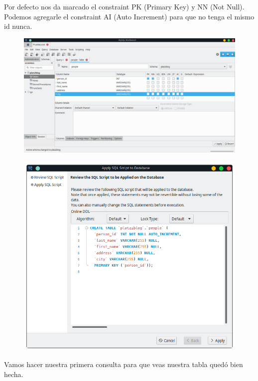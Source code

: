 \documentclass{article}
\begin{document}
\newpage
Por defecto nos da marcado el constraint PK (Primary Key) y NN (Not Null).
Podemos agregarle el constraint AI (Auto Increment) para que no tenga el mismo
id nunca.\\

\begin{figure}[h!]
  \centering
  \includegraphics[scale=0.45]{./Pictures/046_people_atributos.png}
\end{figure}

\begin{figure}[h!]
  \centering
  \includegraphics[scale=0.65]{./Pictures/047_people_apply.png}
\end{figure}

Vamos hacer nuestra primera consulta para que veas nuestra tabla quedó bien hecha.\\
\end{document}
